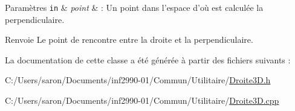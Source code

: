 \begin{DoxyParams}[1]{Paramètres}
\mbox{\tt in}  & {\em point} & \-: Un point dans l'espace d'où est calculée la perpendiculaire.\\
\hline
\end{DoxyParams}
\begin{DoxyReturn}{Renvoie}
Le point de rencontre entre la droite et la perpendiculaire. 
\end{DoxyReturn}


La documentation de cette classe a été générée à partir des fichiers suivants \-:\begin{DoxyCompactItemize}
\item 
C\-:/\-Users/saron/\-Documents/inf2990-\/01/\-Commun/\-Utilitaire/\hyperlink{_droite3_d_8h}{Droite3\-D.\-h}\item 
C\-:/\-Users/saron/\-Documents/inf2990-\/01/\-Commun/\-Utilitaire/\hyperlink{_droite3_d_8cpp}{Droite3\-D.\-cpp}\end{DoxyCompactItemize}
